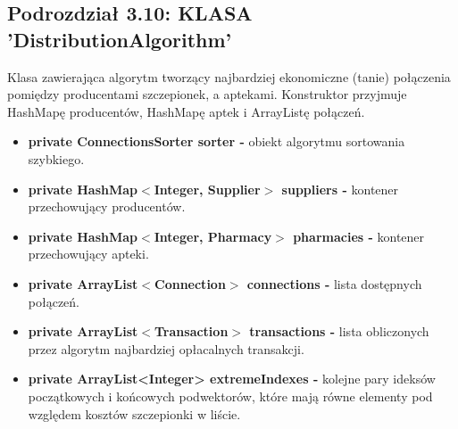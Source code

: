 \documentclass[a4paper]{article}
\begin{document}
\subsection*{Podrozdział 3.10: KLASA 'DistributionAlgorithm'}
\begin{flushleft}
Klasa zawierająca algorytm tworzący najbardziej ekonomiczne (tanie) połączenia pomiędzy producentami szczepionek, a aptekami. Konstruktor przyjmuje HashMapę producentów, HashMapę aptek i ArrayListę połączeń.
\end{flushleft} 
\begin{itemize}
\item \textbf{private ConnectionsSorter sorter -} obiekt algorytmu sortowania szybkiego.
\item \textbf{private HashMap$<$Integer, Supplier$>$ suppliers -} kontener przechowujący producentów.
\item \textbf{private HashMap$<$Integer, Pharmacy$>$ pharmacies -} kontener przechowujący apteki.
\item \textbf{private ArrayList$<$Connection$>$ connections -} lista dostępnych połączeń.
\item \textbf{private ArrayList$<$Transaction$>$ transactions -} lista obliczonych przez algorytm najbardziej opłacalnych transakcji.
\item \textbf{private ArrayList<Integer> extremeIndexes -} kolejne pary ideksów początkowych i końcowych podwektorów, które mają równe elementy pod względem kosztów szczepionki w liście. 
\end{itemize}
\end{document}
